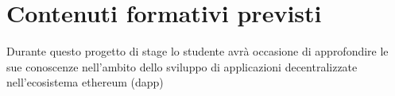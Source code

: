 \section*{Contenuti formativi previsti}
Durante questo progetto di stage lo studente avrà occasione di
approfondire le sue conoscenze nell'ambito dello sviluppo di
applicazioni decentralizzate nell'ecosistema ethereum (dapp)
\newpage

